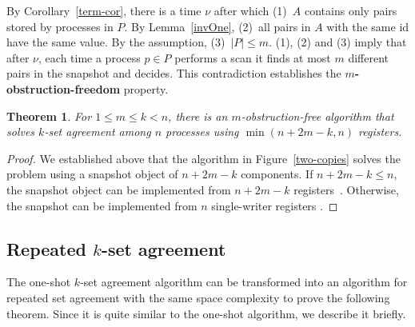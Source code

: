 \documentclass[11pt]{article}
\newtheorem{theorem}{Theorem}
\newcommand{\journalversion}[1]{}
\newcounter{ind}
\begin{document}
By Corollary~\ref{term-cor}, there is a time $\nu$ after which
(1)~$A$ contains only pairs stored by processes in $P$. By
Lemma~\ref{invOne}, (2)~all pairs in $A$ with the same id have the same
value. By the assumption, (3)~$|P|\leq m$. (1), (2) and (3) imply that
after $\nu$, each time a  process  $p\in P$ performs a scan 
it finds at most  $m$ different pairs in the snapshot and 
decides.  This contradiction establishes the {\bf $m$-obstruction-freedom} property.

\begin{theorem}
\label{one-shot-alg}
For $1\leq m\leq k<n$, there is an $m$-obstruction-free algorithm that solves $k$-set agreement among $n$ processes
using $\min(n+2m-k,n)$ registers.
\end{theorem}

\begin{proof}
We established above that the algorithm in Figure~\ref{two-copies} solves the problem using
a snapshot object of $n+2m-k$ components.
If $n+2m-k\leq n$, the snapshot object can be implemented from $n+2m-k$ registers~\cite{EFR07}. 
Otherwise, the snapshot  can be implemented from $n$ single-writer registers \cite{AAD93,VA86}.
\journalversion{If the set of process ids is known a priori, then this completes the
proof.
Otherwise, the $n$ single-writer registers can be implemented from $n$ multi-writer registers
in a non-blocking manner \cite{DFGR15}.}
\end{proof}

\medskip

\subsection{Repeated $k$-set agreement}
The one-shot $k$-set agreement algorithm can be transformed into an algorithm for
repeated set agreement with the same space complexity to prove the following theorem. 
Since it is quite similar to the one-shot algorithm, we
describe it briefly.  
\end{document}

